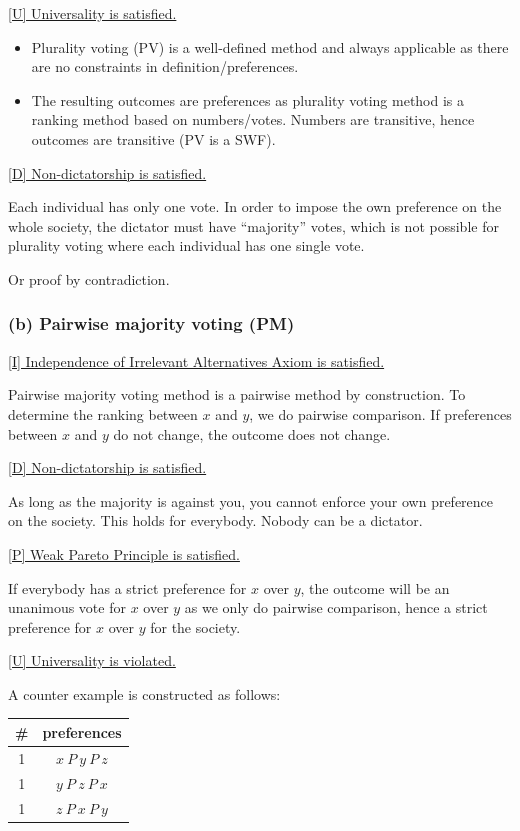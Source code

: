 \documentclass[a4paper]{article}
\begin{document}
\underline{[U] Universality is satisfied. }

\begin{itemize}
    \item Plurality voting (PV) is a well-defined method and always applicable as there are no constraints in definition/preferences.
    \item The resulting outcomes are preferences as plurality voting method is a ranking method based on numbers/votes. Numbers are transitive, hence outcomes are transitive (PV is a SWF).
\end{itemize}

\underline{[D] Non-dictatorship is satisfied.} 

Each individual has only one vote. In order to impose the own preference on the whole society, the dictator must have ``majority'' votes, which is not possible for plurality voting where each individual has one single vote.

Or proof by contradiction.

\subsubsection*{(b) Pairwise majority voting (PM)}

\underline{[I] Independence of Irrelevant Alternatives Axiom is satisfied. }

Pairwise majority voting method is a pairwise method by construction. To determine the ranking between $x$ and $y$, we do pairwise comparison. If preferences between $x$ and $y$ do not change, the outcome does not change.

\underline{[D] Non-dictatorship is satisfied.} 

As long as the majority is against you, you cannot enforce your own preference on the society. This holds for everybody. Nobody can be a dictator.

\underline{[P] Weak Pareto Principle is satisfied.}

If everybody has a strict preference for $x$ over $y$, the outcome will be an unanimous vote for $x$ over $y$ as we only do pairwise comparison, hence a strict preference for $x$ over $y$ for the society.

\underline{[U] Universality is violated.}

A counter example is constructed as follows:

\begin{table}[!htbp]
    \centering
    \begin{tabular}{c|c|}
        \# & preferences         \\ 
        \hline
        1  & $x\: P\: y\: P\: z$ \\
        1  & $y\: P\: z\: P\: x$ \\
        1  & $z\: P\: x\: P\: y$ \\
        \hline
    \end{tabular}
\end{table}
\end{document}
